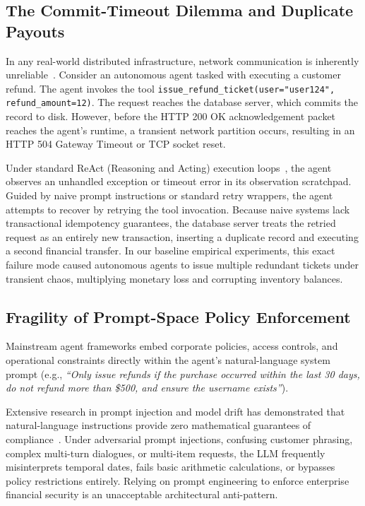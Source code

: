 \subsection{The Commit-Timeout Dilemma and Duplicate Payouts}
In any real-world distributed infrastructure, network communication is inherently unreliable~\cite{rfc9110}. Consider an autonomous agent tasked with executing a customer refund. The agent invokes the tool \texttt{issue\_refund\_ticket(user="user124", refund\_amount=12)}. The request reaches the database server, which commits the record to disk. However, before the HTTP 200 OK acknowledgement packet reaches the agent's runtime, a transient network partition occurs, resulting in an HTTP 504 Gateway Timeout or TCP socket reset.

Under standard ReAct (Reasoning and Acting) execution loops~\cite{yao2022react}, the agent observes an unhandled exception or timeout error in its observation scratchpad. Guided by naive prompt instructions or standard retry wrappers, the agent attempts to recover by retrying the tool invocation. Because naive systems lack transactional idempotency guarantees, the database server treats the retried request as an entirely new transaction, inserting a duplicate record and executing a second financial transfer. In our baseline empirical experiments, this exact failure mode caused autonomous agents to issue multiple redundant tickets under transient chaos, multiplying monetary loss and corrupting inventory balances.

\subsection{Fragility of Prompt-Space Policy Enforcement}
Mainstream agent frameworks embed corporate policies, access controls, and operational constraints directly within the agent's natural-language system prompt (e.g., \textit{``Only issue refunds if the purchase occurred within the last 30 days, do not refund more than \$500, and ensure the username exists''}). 

Extensive research in prompt injection and model drift has demonstrated that natural-language instructions provide zero mathematical guarantees of compliance~\cite{perez2022ignore}. Under adversarial prompt injections, confusing customer phrasing, complex multi-turn dialogues, or multi-item requests, the LLM frequently misinterprets temporal dates, fails basic arithmetic calculations, or bypasses policy restrictions entirely. Relying on prompt engineering to enforce enterprise financial security is an unacceptable architectural anti-pattern.

